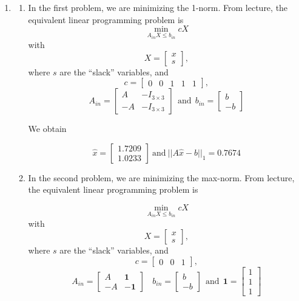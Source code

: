 \documentclass[letterpaper]{article}
\begin{document}
\begin{enumerate}
\item

\begin{enumerate}
\setlength{\itemsep}{.1in}
\renewcommand{\labelenumi}{(\alph{enumi})}
\item In the first problem, we are minimizing the 1-norm. From lecture, the equivalent linear programming problem is
$$ \min_{A_{in} X \le b_{in}} c X$$
with
$$X=\left[ \begin{array}{r}x \\ s\end{array} \right],$$
where $s$ are the ``slack'' variables, and
$$ c=\left[ \begin{array}{ccccc} 0 & 0 & 1 & 1 & 1  \end{array} \right],$$
$$A_{in}=\left[ \begin{array}{rr}A & -I_{3 \times 3}  \\ -A & - I_{3 \times 3} \end{array} \right]~~\text{and}~~b_{in}=\left[ \begin{array}{r}b \\ -b\end{array} \right]$$

We obtain

$$\widehat{x} = \left[ \begin{array}{r}1.7209\\1.0233\end{array} \right]~\text{and}~ ||A\widehat{x} -b||_1=0.7674$$

\item In the second problem, we are minimizing the max-norm. From lecture, the equivalent linear programming problem is

$$ \min_{A_{in} X \le b_{in}} c X$$
with
$$X=\left[ \begin{array}{r}x \\ s\end{array} \right],$$
where $s$ are the ``slack'' variables, and
$$ c=\left[ \begin{array}{ccc} 0 & 0 & 1  \end{array} \right],$$
$$A_{in}=\left[ \begin{array}{rr}A & \textbf{1}  \\ -A & -\textbf{1} \end{array} \right]~~~~b_{in}=\left[ \begin{array}{r}b \\ -b\end{array} \right]~~\text{and}~~ \textbf{1} = \left[ \begin{array}{r}1 \\1 \\ 1 \end{array} \right]$$


\end{enumerate}
\end{enumerate}
\end{document}
